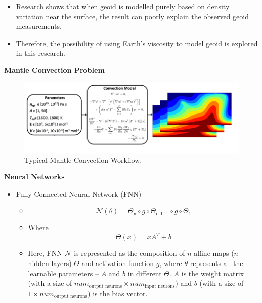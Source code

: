 {\begin{itemize}
     \item Research shows that when geoid is modelled purely based on density variation near the surface, the result can poorly explain the observed geoid measurements.

     \item Therefore, the possibility of using Earth's viscosity to model geoid is explored in this research.
\end{itemize}

\textbf{Mantle Convection Problem}

\begin{figure}[H]
    \includegraphics[width=\linewidth]{figures/Mantle_Convection_workflow.png}
    \caption{Typical Mantle Convection Workflow.}
\end{figure}

\textbf{Neural Networks}
\begin{itemize}
    \item Fully Connected Neural Network (FNN)
        \begin{itemize}
            \item\begin{equation}
            \mathcal{N}(\theta) = \Theta_\text{n} \circ g \circ \Theta_\text{n-1} ... \circ g \circ \Theta_1
            \end{equation}

            \item Where \begin{equation} \Theta(x) = xA^{T} + b \end{equation}

            \item Here, FNN $\mathcal{N}$ is represented as the composition of $n$ affine maps ($n$ hidden layers) $\Theta$ and activation function $g$, where $\theta$ represents all the learnable parameters -- $A$ and $b$ in different $\Theta$. $A$ is the weight matrix (with a size of $num_\text{output neurons} \times num_\text{input neurons}$) and $b$ (with a size of $1 \times num_\text{output neurons}$) is the bias vector.
            

\end{itemize}
\end{itemize}}
